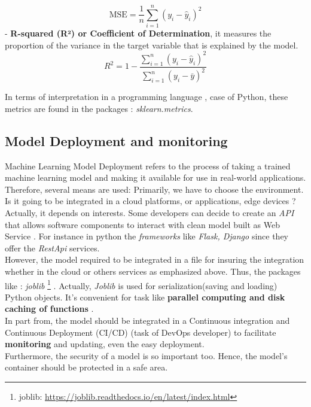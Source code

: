 \documentclass[12pt,a4paper, oneside]{book}
\begin{document}
\begin{equation}
\text{MSE} = \frac{1}{n} \sum_{i=1}^{n} (y_i - \hat{y}_i)^2
\end{equation}
- \textbf{R-squared (R²) or Coefficient of Determination}, it measures the proportion of the variance in the target variable that is explained by the model. 
\begin{equation}
	R^2 = 1 - \frac{\sum_{i=1}^{n} (y_i - \hat{y}_i)^2}{\sum_{i=1}^{n} (y_i - \bar{y})^2}
\end{equation}

In terms of interpretation in a programming language , case of Python, these metrics are found in the packages : \textit{sklearn.metrics}.\\

\subsection{Model Deployment and monitoring}
Machine Learning Model Deployment refers to the process of taking a trained machine learning model and making it available for use in real-world applications. Therefore, several means are used: Primarily, we have to choose the environment. Is it going to be integrated in a cloud platforms, or applications, edge devices ? Actually, it depends on interests. Some developers can decide to create an \textit{API} that allows software components to interact with clean model built as Web Service \citep{singh2021deploy}. For instance in python the \textit{frameworks} like \textit{Flask, Django} since they offer the \textit{RestApi} services. \\

However, the model required to be integrated in a file for insuring the integration whether in the cloud or others services as emphasized above. Thus, the packages like : \textit{joblib} \footnote{joblib: \url{https://joblib.readthedocs.io/en/latest/index.html}} . Actually, \textit{Joblib} is used for serialization(saving and loading) Python objects. It's convenient for task like \textbf{parallel computing and disk caching of functions}  \citep{faouzi2020pyts}.\\

In part from, the model should be integrated in a Continuous integration and Continuous Deployment (CI/CD) (task of DevOps developer) to facilitate \textbf{monitoring} and updating, even the easy deployment. \\

Furthermore, the security of a model is so important too. Hence, the model's container should be protected in a safe area. 
\end{document}
